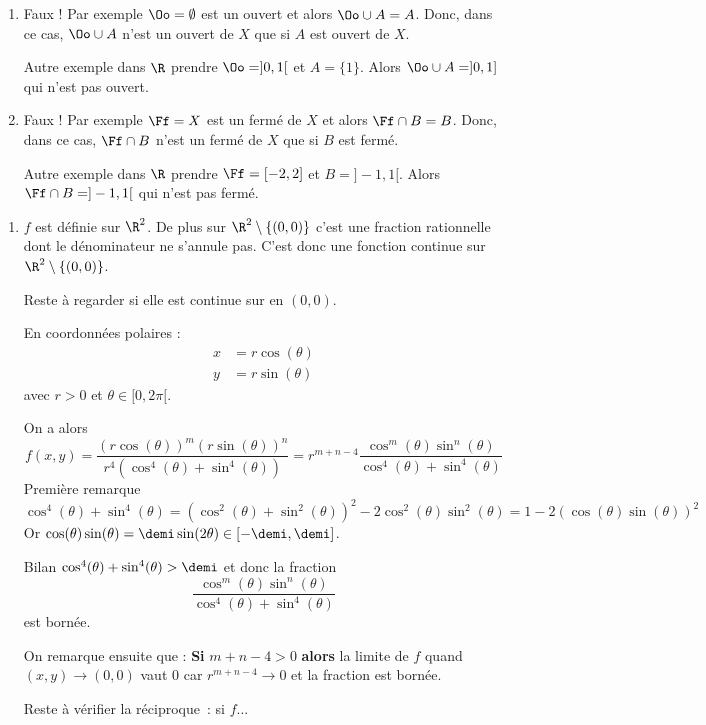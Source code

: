 \documentclass{article}
\begin{document}

\exercice{}

\begin{enumerate}
\item Faux !
Par exemple $\Oo = \emptyset$ est un ouvert et alors $\Oo \cup A = A$. Donc, dans ce cas, $\Oo \cup A$ n'est un ouvert de $X$ que si $A$ est ouvert de $X$.

Autre exemple dans $\R$ prendre $\Oo = ]0,1[$ et $A = \{1\}$. Alors $\Oo \cup A = ]0,1]$ qui n'est pas ouvert.
\item Faux !
Par exemple $\Ff = X$ est un fermé de $X$ et alors $\Ff \cap B = B$. Donc, dans ce cas, $\Ff \cap B$ n'est un fermé de $X$ que si $B$ est fermé.

Autre exemple dans $\R$ prendre $\Ff = [-2,2]$ et $B = ]-1,1[$. Alors $\Ff \cap B = ]-1,1[$ qui n'est pas fermé.
\end{enumerate}

\exercice{}

\begin{enumerate}
\item $f$ est définie sur $\R^2$. De plus sur $\R^2 \setminus \{(0,0)\}$ c'est une fraction rationnelle dont le dénominateur ne s'annule pas. C'est donc une fonction continue sur $\R^2 \setminus \{(0,0)\}$.

Reste à regarder si elle est continue sur en $(0,0)$.

En coordonnées polaires :
\begin{align*}
x &= r\cos(\theta)\\
y &= r\sin(\theta)
\end{align*}	
 avec $r>0$ et $\theta \in [0,2\pi[$.
 
On a alors
\[
f(x,y) = \dfrac{(r\cos(\theta))^m(r\sin(\theta))^n}{r^4(\cos^4(\theta)+\sin^4(\theta))}
= r^{m+n-4} \dfrac{\cos^m(\theta)\sin^n(\theta)}{\cos^4(\theta)+\sin^4(\theta)}
\]
Première remarque 
\[
\cos^4(\theta)+\sin^4(\theta) = (\cos^2(\theta) + \sin^2(\theta))^2 - 2\cos^2(\theta)\sin^2(\theta) = 1 - 2(\cos(\theta)\sin(\theta))^2
\]
Or $\cos(\theta)\sin(\theta) = \demi\sin(2\theta) \in [-\demi,\demi]$.

Bilan $\cos^4(\theta)+\sin^4(\theta) > \demi$ et donc la fraction
\[
\dfrac{\cos^m(\theta)\sin^n(\theta)}{\cos^4(\theta)+\sin^4(\theta)}
\] 
est bornée.

On remarque ensuite que : \textbf{Si} $m+n-4 > 0$ \textbf{alors} la limite de $f$ quand $(x,y) \to (0,0)$ vaut $0$ car $r^{m+n-4} \to 0$ et la fraction est bornée.

Reste à vérifier la réciproque~: si $f$...
\end{enumerate}
\end{document}
